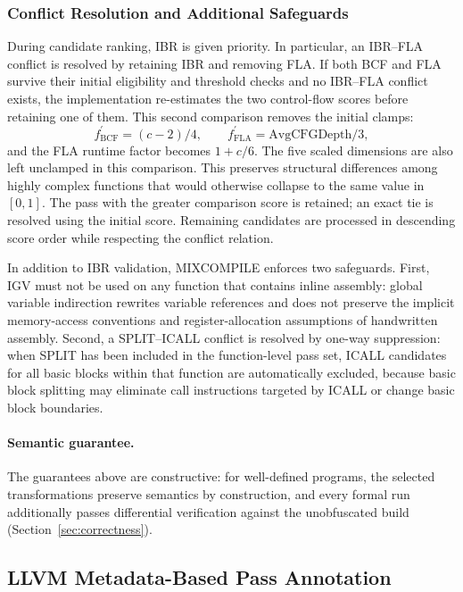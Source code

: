\documentclass[pdflatex,sn-mathphys-num]{sn-jnl}
\theoremstyle{thmstyleone}%
\theoremstyle{thmstyletwo}%
\theoremstyle{thmstylethree}%
\begin{document}
\subsubsection{Conflict Resolution and Additional Safeguards}

During candidate ranking, IBR is given priority. In particular, an IBR--FLA conflict
is resolved by retaining IBR and removing FLA.  If both BCF and FLA survive their
initial eligibility and threshold checks and no IBR--FLA conflict exists, the
implementation re-estimates the two control-flow scores before retaining one of them.
This second comparison removes the initial clamps:
\begin{equation}
f^{\prime}_{\mathrm{BCF}}=(c-2)/4,\qquad
f^{\prime}_{\mathrm{FLA}}=\mathrm{AvgCFGDepth}/3,
\end{equation}
and the FLA runtime factor becomes $1+c/6$.  The five scaled dimensions are also left
unclamped in this comparison.  This preserves structural differences among highly
complex functions that would otherwise collapse to the same value in $[0,1]$.  The
pass with the greater comparison score is retained; an exact tie is resolved using the
initial score.  Remaining candidates are processed in descending score order while
respecting the conflict relation.

In addition to IBR validation, MIXCOMPILE enforces two safeguards. First, IGV must
not be used on any function that contains inline assembly: global variable indirection
rewrites variable references and does not preserve the implicit memory-access
conventions and register-allocation assumptions of handwritten assembly. Second, a
SPLIT--ICALL conflict is resolved by one-way suppression: when SPLIT has been included
in the function-level pass set, ICALL candidates for all basic blocks within that
function are automatically excluded, because basic block splitting may eliminate call
instructions targeted by ICALL or change basic block boundaries.

\paragraph{Semantic guarantee.}
The guarantees above are constructive: for well-defined programs, the selected
transformations preserve semantics by construction, and every formal run
additionally passes differential verification against the unobfuscated build
(Section~\ref{sec:correctness}).

\subsection{LLVM Metadata-Based Pass Annotation}
\end{document}
